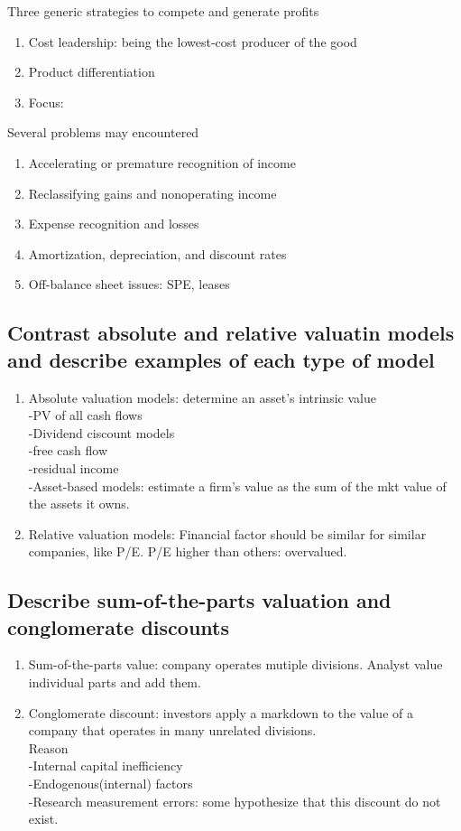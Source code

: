 \documentclass{article}
\newcommand{\be}{\begin{enumerate}}
\newcommand{\ee}{\end{enumerate}}
\begin{document}
Three generic strategies to compete and generate profits
\be
    \item Cost leadership: being the lowest-cost producer of the good
    \item Product differentiation
    \item Focus: 
\ee

Several problems may encountered
\be
    \item Accelerating or premature recognition of income
    \item Reclassifying gains and nonoperating income
    \item Expense recognition and losses
    \item Amortization, depreciation, and discount rates
    \item Off-balance sheet issues: SPE, leases
\ee
\subsection{Contrast absolute and relative valuatin models and describe examples 
of each type of model}
\be
    \item Absolute valuation models: determine an asset's intrinsic value
        \\-PV of all cash flows
        \\-Dividend ciscount models
        \\-free cash flow
        \\-residual income
        \\-Asset-based models: estimate a firm's value as the sum of the mkt value
        of the assets it owns.
    \item Relative valuation models: Financial factor should be similar for similar
        companies, like P/E. P/E higher than others: overvalued.
\ee
\subsection{Describe sum-of-the-parts valuation and conglomerate discounts}
\be
    \item Sum-of-the-parts value: company operates mutiple divisions. Analyst value
        individual parts and add them.
    \item Conglomerate discount: investors apply a markdown to the value of a company that
        operates in many unrelated divisions.
        \\Reason
        \\-Internal capital inefficiency
        \\-Endogenous(internal) factors
        \\-Research measurement errors: some hypothesize that this discount do not
        exist.
\ee
\end{document}
